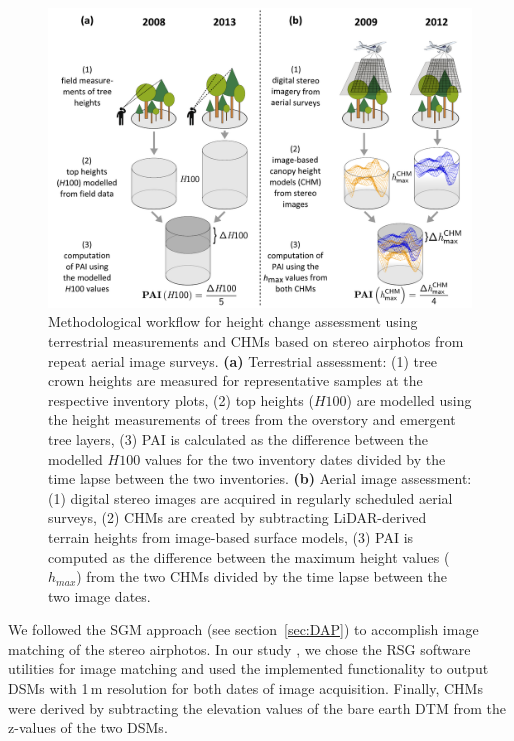 \begin{figure}[!b]
	\centering
	\includegraphics[width=1\textwidth]{Figures/heightChange/Method_heightChange} %
	\caption[Methodological workflow for height change assessment using terrestrial measurements and image-based CHMs.]
	{Methodological workflow for height change assessment using terrestrial measurements and \acp{CHM} 
		based on stereo airphotos from repeat aerial image surveys. \textbf{(a)} Terrestrial assessment: 
		(1) tree crown heights are measured for representative samples at the respective inventory plots, 
		(2) top heights ($H100$) are modelled using the height measurements of trees from the overstory and emergent tree layers, 
		(3) \ac{PAI} is calculated as the difference between 
		the modelled $H100$ values for
		the two inventory dates divided by the time lapse between the two inventories. 
		\textbf{(b)} Aerial image assessment: 
		(1) digital stereo images are acquired in regularly scheduled aerial surveys, 
		(2) \acp{CHM} are created by subtracting \ac{LiDAR}-derived terrain heights from image-based surface models, 
		(3) \ac{PAI} is computed as the difference between the maximum height
		values ($h_{max}$) from the two \acp{CHM} divided by the time lapse between the two image dates.}
	\label{fig:meth_heightChange}
\end{figure}

We followed the \ac{SGM} approach (see section~\ref{sec:DAP}) to accomplish image matching of the stereo airphotos. 
In our study \parencite{Stepper.2015},
we chose the RSG software utilities for image matching and used the implemented functionality to output \acp{DSM} with 1\,m resolution for both dates of image acquisition.
Finally, \acp{CHM} were derived by subtracting the elevation values of the bare earth \ac{DTM} from the z-values of the two \acp{DSM}.

